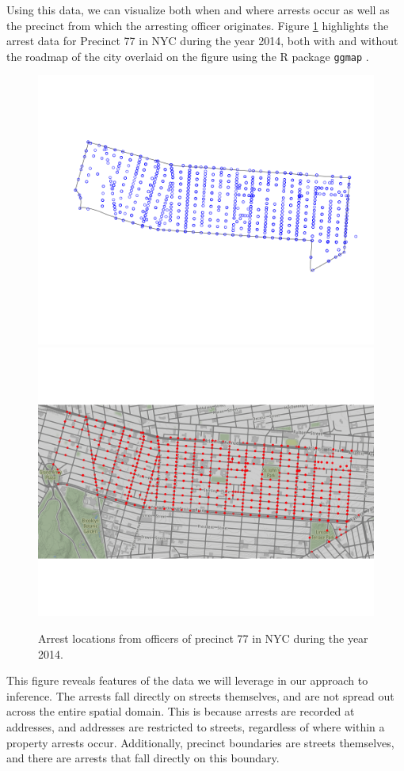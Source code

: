 \documentclass[a4paper,11pt]{article}
\begin{document}
Using this data, we can visualize both when and where arrests occur as well as the precinct from which the arresting officer originates. Figure \ref{fig:Precinct77} highlights the arrest data for Precinct 77 in NYC during the year 2014, both with and without the roadmap of the city overlaid on the figure using the R package \texttt{ggmap}  \citep{ggmap2013}. 
\begin{figure}[h]
    \centering
    \includegraphics[scale=0.2]{plots/ArrestsPrec77.png} \includegraphics[scale=0.2]{plots/ArrestPrec77GoogleMaps.png}
    \caption{Arrest locations from officers of precinct 77 in NYC during the year 2014.}
    \label{fig:Precinct77}
\end{figure}
This figure reveals features of the data we will leverage in our approach to inference. The arrests fall directly on streets themselves, and are not spread out across the entire spatial domain. This is because arrests are recorded at addresses, and addresses are restricted to streets, regardless of where within a property arrests occur. Additionally, precinct boundaries are streets themselves, and there are arrests that fall directly on this boundary. 
\end{document}
